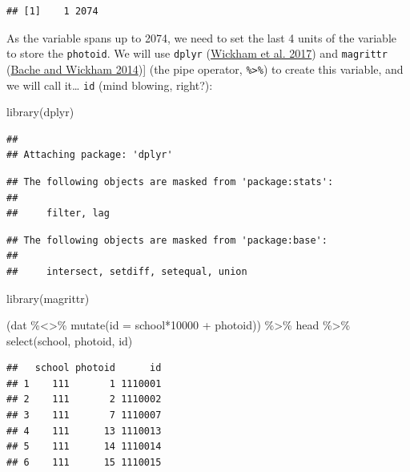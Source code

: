 \documentclass[
]{book}
\newenvironment{Shaded}{\begin{snugshade}}{\end{snugshade}}
\newcommand{\AttributeTok}[1]{\textcolor[rgb]{0.77,0.63,0.00}{#1}}
\newcommand{\DecValTok}[1]{\textcolor[rgb]{0.00,0.00,0.81}{#1}}
\newcommand{\FunctionTok}[1]{\textcolor[rgb]{0.00,0.00,0.00}{#1}}
\newcommand{\NormalTok}[1]{#1}
\newcommand{\SpecialCharTok}[1]{\textcolor[rgb]{0.00,0.00,0.00}{#1}}
\begin{document}
\begin{verbatim}
## [1]    1 2074
\end{verbatim}

As the variable spans up to 2074, we need to set the last 4 units of the variable to store the \texttt{photoid}. We will use \texttt{dplyr} (\protect\hyperlink{ref-R-dplyr}{Wickham et al. 2017}) and \texttt{magrittr} (\protect\hyperlink{ref-R-magrittr}{Bache and Wickham 2014}){]} (the pipe operator, \texttt{\%\textgreater{}\%}) to create this variable, and we will call it\ldots{} \texttt{id} (mind blowing, right?):

\begin{Shaded}
\begin{Highlighting}[]
\FunctionTok{library}\NormalTok{(dplyr)}
\end{Highlighting}
\end{Shaded}

\begin{verbatim}
## 
## Attaching package: 'dplyr'
\end{verbatim}

\begin{verbatim}
## The following objects are masked from 'package:stats':
## 
##     filter, lag
\end{verbatim}

\begin{verbatim}
## The following objects are masked from 'package:base':
## 
##     intersect, setdiff, setequal, union
\end{verbatim}

\begin{Shaded}
\begin{Highlighting}[]
\FunctionTok{library}\NormalTok{(magrittr)}

\NormalTok{(dat }\SpecialCharTok{\%\textless{}\textgreater{}\%} \FunctionTok{mutate}\NormalTok{(}\AttributeTok{id =}\NormalTok{ school}\SpecialCharTok{*}\DecValTok{10000} \SpecialCharTok{+}\NormalTok{ photoid)) }\SpecialCharTok{\%\textgreater{}\%}
\NormalTok{  head }\SpecialCharTok{\%\textgreater{}\%}
  \FunctionTok{select}\NormalTok{(school, photoid, id)}
\end{Highlighting}
\end{Shaded}

\begin{verbatim}
##   school photoid      id
## 1    111       1 1110001
## 2    111       2 1110002
## 3    111       7 1110007
## 4    111      13 1110013
## 5    111      14 1110014
## 6    111      15 1110015
\end{verbatim}
\end{document}
